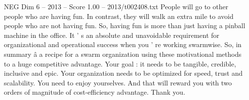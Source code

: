 \begin{textsample}{NEG Dim 6 – 2013 – Score 1.00 – 2013/t002408.txt}
People will go to other people who are having fun.
In contrast, they will walk an extra mile to avoid people who are not having fun.
So, having fun is more than just having a pinball machine in the office.
It ' s an absolute and unavoidable requirement for organizational and operational success when you ' re working swarmwise.
So, in summary â a recipe for a swarm organization using these motivational methods to a huge competitive advantage.
Your goal : it needs to be tangible, credible, inclusive and epic.
Your organization needs to be optimized for speed, trust and scalability.
You need to enjoy yourselves.
And that will reward you with two orders of magnitude of cost-efficiency advantage.
Thank you.

\end{textsample}
